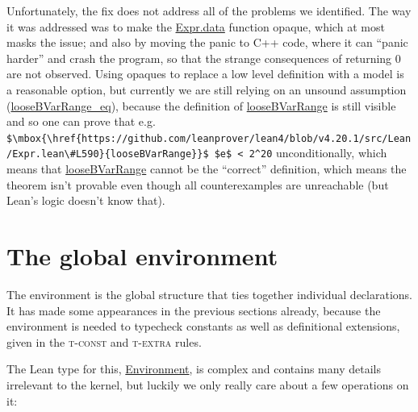 \documentclass[sigplan,10pt,screen]{acmart}\settopmatter{printfolios=true,printccs=false,printacmref=false}
\newcommand{\code}[1]{\mbox{\ttfamily\small #1}}
\begin{document}
Unfortunately, the fix does not address all of the problems we identified. The way it was addressed was to make the \href{https://github.com/leanprover/lean4/blob/v4.20.1/src/Lean/Expr.lean#L470}{\code{Expr.data}} function opaque, which at most masks the issue; and also by moving the panic to C++ code, where it can ``panic harder'' and crash the program, so that the strange consequences of returning $0$ are not observed. Using opaques to replace a low level definition with a model is a reasonable option, but currently we are still relying on an unsound assumption (\href{https://github.com/digama0/lean4lean/blob/cpp2026/Lean4Lean/Verify/Axioms.lean#L164-L165}{\code{looseBVarRange\_eq}}), because the definition of \href{https://github.com/leanprover/lean4/blob/v4.20.1/src/Lean/Expr.lean#L590}{\code{looseBVarRange}} is still visible and so one can prove that e.g. \lstinline|$\mbox{\href{https://github.com/leanprover/lean4/blob/v4.20.1/src/Lean/Expr.lean\#L590}{looseBVarRange}}$ $e$ < 2^20| unconditionally, which means that \href{https://github.com/leanprover/lean4/blob/v4.20.1/src/Lean/Expr.lean#L590}{\code{looseBVarRange}} cannot be the ``correct'' definition, which means the theorem isn't provable even though all counterexamples are unreachable (but Lean's logic doesn't know that).

\section{The global environment}\label{sec:env}

The environment is the global structure that ties together individual declarations. It has made some appearances in the previous sections already, because the environment is needed to typecheck constants as well as definitional extensions, given in the \textsc{t-const} and \textsc{t-extra} rules.

The Lean type for this, \href{https://github.com/leanprover/lean4/blob/v4.20.1/src/Lean/Environment.lean#L198}{\code{Environment}}, is complex and contains many details irrelevant to the kernel, but luckily we only really care about a few operations on it:
\end{document}
